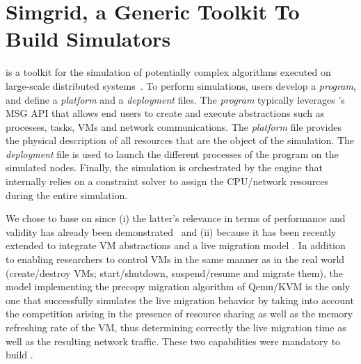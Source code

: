 \section{Simgrid, a Generic Toolkit To Build Simulators}
\label{sec:sg}


\sg is a toolkit for the simulation of potentially complex algorithms
executed on large-scale distributed
systems~\cite{casanova:hal-01017319}.
%
To perform simulations, users develop a \emph{program}, and define a
\emph{platform} and a \emph{deployment} files. The \emph{program}
typically leverages \sg's MSG API that allows end users to create
and execute \sg abstractions such as processes, tasks, VMs and network
communications. The \emph{platform} file provides the physical
description of all resources that are the object of the simulation.
The \emph{deployment} file is used to launch the different \sg
processes of the program on the simulated nodes.
Finally, the simulation is orchestrated by the \sg engine that
internally relies on a constraint solver to assign the CPU/network
resources during the entire
simulation.%


We chose to base \vmps on \sg
since (i) the latter's relevance in terms of performance and validity
has already been demonstrated~\cite{simgridpub} and (ii) because it
has been recently extended to integrate VM abstractions and a live
migration model \cite{Hirofuchi:2013:ALM:2568486.2568524}. In addition
to enabling researchers to control VMs in the same manner as in the
real world (\eg create/destroy VMs; start/shutdown, suspend/resume and
migrate them), the model implementing the precopy migration algorithm
of Qemu/KVM is the only one that successfully simulates the live
migration behavior by taking into account the competition arising in
the presence of resource sharing as well as the memory refreshing rate
of the VM, thus determining correctly the live migration time as well
as the resulting network traffic. These two capabilities were
mandatory to build \vmps.%



